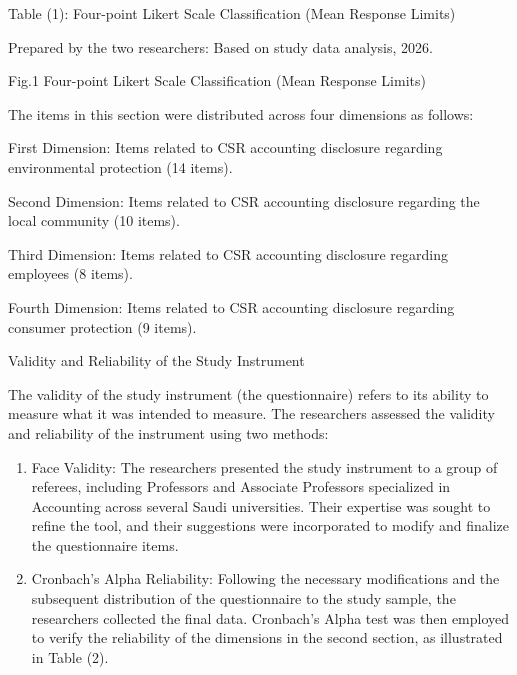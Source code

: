 \documentclass{default}
\begin{document}
Table (1): Four-point Likert Scale Classification (Mean Response Limits)

\begin{table}[htbp]
\centering
{}
\caption{}

\end{table}

Prepared by the two researchers: Based on study data analysis, 2026.

Fig.1 Four-point Likert Scale Classification (Mean Response Limits)

The items in this section were distributed across four dimensions as follows:

First Dimension: Items related to CSR accounting disclosure regarding environmental protection (14 items).

Second Dimension: Items related to CSR accounting disclosure regarding the local community (10 items).

Third Dimension: Items related to CSR accounting disclosure regarding employees (8 items).

Fourth Dimension: Items related to CSR accounting disclosure regarding consumer protection (9 items).

Validity and Reliability of the Study Instrument

The validity of the study instrument (the questionnaire) refers to its ability to measure what it was intended to measure. The researchers assessed the validity and reliability of the instrument using two methods:

\begin{enumerate}
  \item Face Validity: The researchers presented the study instrument to a group of referees, including Professors and Associate Professors specialized in Accounting across several Saudi universities. Their expertise was sought to refine the tool, and their suggestions were incorporated to modify and finalize the questionnaire items.
  \item Cronbach’s Alpha Reliability: Following the necessary modifications and the subsequent distribution of the questionnaire to the study sample, the researchers collected the final data. Cronbach’s Alpha test was then employed to verify the reliability of the dimensions in the second section, as illustrated in Table (2).
\end{enumerate}
\end{document}
